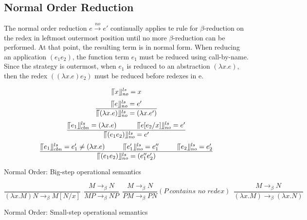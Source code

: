 \documentclass[a4paper,11pt,twoside]{report}
\begin{document}
\subsection{Normal Order Reduction}{\label{subsec:normal}}

The normal order reduction $e\xrightarrow{no} e'$ continually applies te rule for $\beta$-reduction on the redex in leftmost outermost position until no more $\beta$-reduction can be performed. At that point, the resulting term is in normal form. When reducing an application $(e_1e_2)$, the function term $e_1$ must be reduced using call-by-name. Since the strategy is outermost, when $e_1$ is reduced to an abstraction $(\lambda x.e)$, then the redex $((\lambda x.e)e_2)$ must be reduced before redexes in e.

\begin{equation*}
\llceil x \rrfloor ^{ls} _{no} = x
\end{equation*}
\begin{equation*}
\frac{\llceil e \rrfloor ^{ls} _{no} = e'}{\llceil (\lambda x.e) \rrfloor ^{ls} _{no} = (\lambda x.e')}
\end{equation*}
\begin{equation*}
\frac{\llceil e_1 \rrfloor ^{ls} _{cbn} = (\lambda x.e)\ \ \ \ \ \ \ \ \ \llceil e[e_2/x] \rrfloor ^{ls} _{no} = e'}{\llceil (e_1e_2) \rrfloor ^{ls} _{no} = e'}
\end{equation*}
\begin{equation*}
\frac{\llceil e_1 \rrfloor ^{ls} _{cbn} = e'_1\neq (\lambda x.e)\ \ \ \ \ \ \ \ \llceil e'_1 \rrfloor ^{ls} _{no} = e''_1\ \ \ \ \ \ \ \ \llceil e_2 \rrfloor ^{ls} _{no} = e'_2}{\llceil (e_1e_2) \rrfloor ^{ls} _{no} = (e''_1e'_2)}
\end{equation*}

\begin{center}
Normal Order: Big-step operational semantics
\end{center}

\begin{equation*}
\frac{}{(\lambda x.M)N \rightarrow _\beta M[N/x]}\ \  
\frac{M \rightarrow _\beta N}{MP \rightarrow _\beta NP}\ \ 
\frac{M \rightarrow _\beta N}{PM \rightarrow _\beta PN}(P\ \textit{contains no redex})\ \ 
\frac{M \rightarrow _\beta N}{(\lambda x.M) \rightarrow _\beta (\lambda x.N)}
\end{equation*}
\begin{center}
Normal Order: Small-step operational semantics
\end{center}
\end{document}
